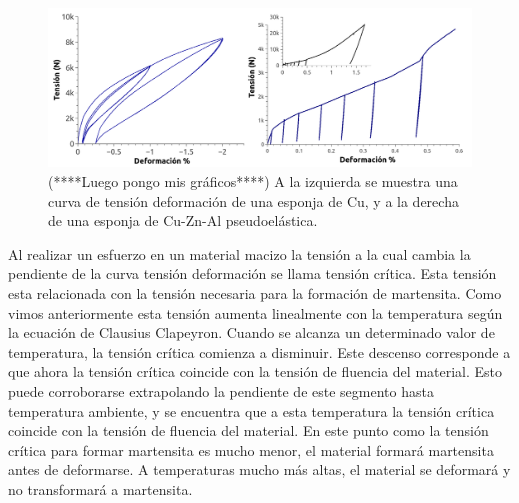 \documentclass[a4paper,12pt,fleqn,twoside,openany]{book}
\begin{document}


\begin{figure}[h]
 \centering
 \includegraphics[width=1\textwidth]{EspA100yEspCu.png}
 \caption{(****Luego pongo mis gráficos****) A la izquierda se muestra una curva de tensión deformación de una esponja de Cu, y a la derecha de una esponja 
 de Cu-Zn-Al pseudoelástica.} 
 \label{fig:memoria}
 \end{figure}


Al realizar un esfuerzo en un material macizo la tensión a la cual cambia la pendiente de la curva tensión deformación se llama tensión crítica. Esta 
tensión esta relacionada con la tensión necesaria para la formación de martensita. Como vimos anteriormente esta tensión aumenta linealmente con la temperatura según la 
ecuación de Clausius Clapeyron. Cuando se alcanza un determinado valor de temperatura, la tensión crítica comienza a disminuir. Este descenso corresponde a que ahora la tensión crítica 
coincide con la tensión de fluencia del material. Esto puede corroborarse extrapolando la pendiente de este segmento hasta temperatura ambiente, y se encuentra que a esta 
temperatura la tensión crítica coincide con la tensión de fluencia del material. En este punto como la tensión crítica para formar martensita es mucho menor, el 
material formará martensita antes de deformarse. A temperaturas mucho más altas, el material se deformará y no transformará a martensita.
\end{document}
